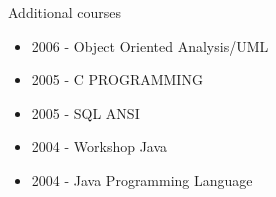 \documentclass{resume}
\begin{document}
  \begin{rSection}{Additional courses}
  \end{rSection}  

  \begin{itemize}
    \item 2006 - Object Oriented Analysis/UML
    \item 2005 - C PROGRAMMING
    \item 2005 - SQL ANSI
    \item 2004 - Workshop Java
    \item 2004 - Java Programming Language
  \end{itemize}

  
\end{document}
